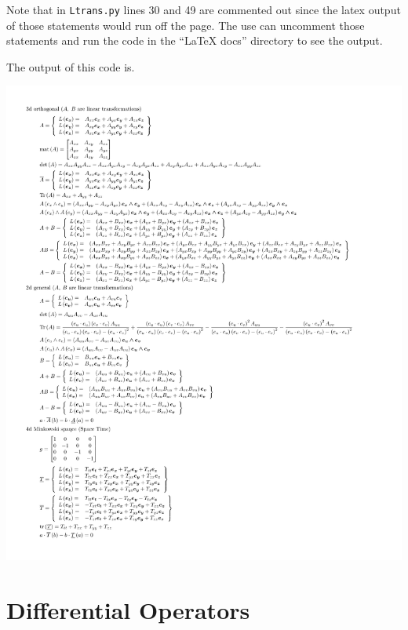 \documentclass[12pt]{report}
\newcommand{\T}[1]{\texttt{#1}}
\newcommand{\includecode}[1]{}
\begin{document}
Note that in \T{Ltrans.py} lines 30 and 49 are commented out since the latex output of those statements would run off the page.  The
use can uncomment those statements and run the code in the ``LaTeX docs'' directory to see the output.
\includecode{python/Ltrans.py}
\newpage The output of this code is.
\begin{center}
	\includegraphics[scale=0.65]{python/Ltrans.pdf}
\end{center}

\section{Differential Operators}
\end{document}
